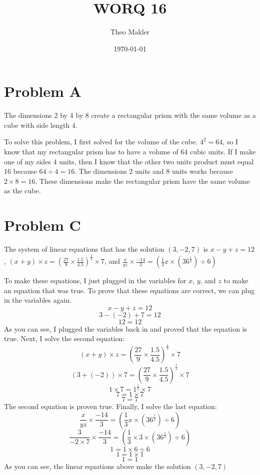 \documentclass[a4paper]{article}
\title{WORQ 16}
\author{Theo Makler}
\date{\today}
\begin{document}
\maketitle

\section{Problem A}

The dimensions 2 by 4 by 8 create a rectangular prism with the same volume as a cube with side length $4$.

To solve this problem, I first solved for the volume of the cube. $4^2=64$, so I know that my rectangular prism has to have a volume of 64 cubic units. If I make one of my sides 4 units, then I know that the other two units product must equal 16 because $64 \div 4 = 16$. The dimensions 2 units and 8 units works because $2\times8=16$. These dimensions make the rectangular prism have the same volume as the cube.

\section{Problem C}

The system of linear equations that has the solution $(3,-2,7)$ is $x-y+z=12$, $(x+y)\times z =(\frac{27}{9}\times\frac{1.5}{4.5})^\frac{1}{3}\times7$, and $\frac{x}{yz}\times\frac{-14}{3}=(\frac{1}{3}x \times (36^\frac{1}{2}) \div 6)$

To make these equations, I just plugged in the variables for $x$, $y$, and $z$ to make an equation that was true. To prove that these equations are correct, we can plug in the variables again.
$$x-y+z=12$$
$$3-(-2)+7=12$$
$$12=12$$
As you can see, I plugged the variables back in and proved that the equation is true. Next, I solve the second equation:
$$(x+y)\times z =(\frac{27}{9}\times\frac{1.5}{4.5})^\frac{1}{3}\times7$$
$$(3+(-2))\times 7 =(\frac{27}{9}\times\frac{1.5}{4.5})^\frac{1}{3}\times7$$
$$1\times 7 =1^\frac{1}{3}\times7$$
$$7=1\times7$$
$$7=7$$
The second equation is proven true. Finally, I solve the last equation:
$$\frac{x}{yz}\times\frac{-14}{3}=(\frac{1}{3}x \times (36^\frac{1}{2}) \div 6)$$
$$\frac{3}{-2\times7}\times\frac{-14}{3}=(\frac{1}{3}\times3 \times (36^\frac{1}{2}) \div 6)$$
$$1=1 \times 6 \div 6$$
$$1=1\times1$$
$$1=1$$
As you can see, the linear equations above make the solution $(3,-2,7)$
\end{document}
